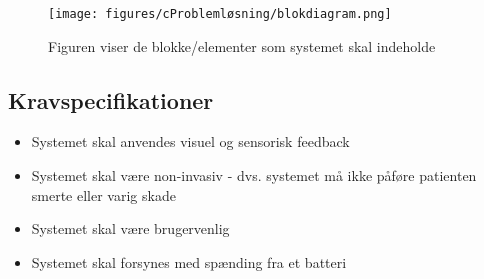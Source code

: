 \begin{figure}[H]
	\centering
	\texttt{[image: figures/cProblemløsning/blokdiagram.png]}
	\caption{Figuren viser de blokke/elementer som systemet skal indeholde}
	\label{krav_blok}
\end{figure}

\subsection{Kravspecifikationer}
\begin{itemize}
\item Systemet skal anvendes visuel og sensorisk feedback 
\item Systemet skal være non-invasiv - dvs. systemet må ikke påføre patienten smerte eller varig skade
\item Systemet skal være brugervenlig
\item Systemet skal forsynes med spænding fra et batteri
\end{itemize}





